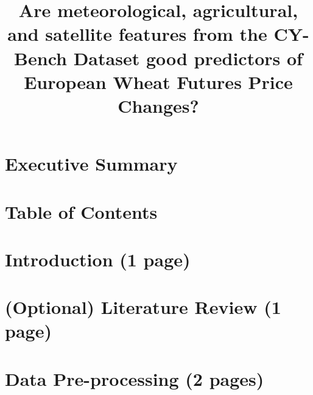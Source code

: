 \documentclass[pdflatex,sn-mathphys-num, oneside]{sn-jnl}%
\theoremstyle{thmstyleone}%
\theoremstyle{thmstyletwo}%
\theoremstyle{thmstylethree}%
\begin{document}
\title[Article Title]{Are meteorological, agricultural, and satellite features from the CY-Bench Dataset good predictors of European Wheat Futures Price Changes?}


\author{}
\author{}
\author{}



\maketitle

\clearpage

\section{Executive Summary}\label{sec1}

\clearpage

\section{Table of Contents}\label{sec2}

\clearpage

\section{Introduction (1 page)}\label{sec3}

\clearpage

\section{(Optional) Literature Review (1 page)}\label{sec3}

\clearpage

\section{Data Pre-processing (2 pages)}\label{sec3}
\end{document}
